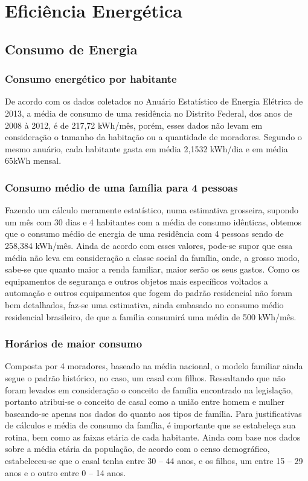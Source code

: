 \chapter{Eficiência Energética}
\section{Consumo de Energia}

\subsection{Consumo energético por habitante}

	De acordo com os dados coletados no Anuário Estatístico de Energia Elétrica de 2013, a média de consumo de uma residência no Distrito Federal, dos anos de 2008 à 2012, é de 217,72 kWh/mês, porém, esses dados não levam em consideração o tamanho da habitação ou a quantidade de moradores. Segundo o mesmo anuário, cada habitante gasta em média 2,1532 kWh/dia e em média 65kWh mensal\cite{2013Aneel}.

\subsection{Consumo médio de uma família para 4 pessoas}

	Fazendo um cálculo meramente estatístico, numa estimativa grosseira, supondo um mês com 30 dias e 4 habitantes com a média de consumo idênticas, obtemos que o consumo médio de energia de uma residência com 4 pessoas sendo de 258,384 kWh/mês. Ainda de acordo com esses valores, pode-se supor que essa média não leva em consideração a classe social da família, onde, a grosso modo, sabe-se que quanto maior a renda familiar, maior serão os seus gastos. Como os equipamentos de segurança e outros objetos mais específicos voltados a automação e outros equipamentos que fogem do padrão residencial não foram bem detalhados, faz-se uma estimativa, ainda embasado no consumo médio residencial brasileiro, de que a família consumirá uma média de 500 kWh/mês.

\subsection{Horários de maior consumo}

	Composta por 4 moradores, baseado na média nacional, o modelo familiar ainda segue o padrão histórico, no caso, um casal com filhos. Ressaltando que não foram levados em consideração o conceito de família encontrado na legislação, portanto atribui-se o conceito de casal como a união entre homem e mulher baseando-se apenas nos dados do \cite{IBGE} quanto aos tipos de família. Para justificativas de cálculos e média de consumo da família, é importante que se estabeleça sua rotina, bem como as faixas etária de cada habitante. Ainda com base nos dados sobre a média etária da população, de acordo com o censo demográfico, estabeleceu-se que o casal tenha entre 30 – 44 anos, e os filhos, um entre 15 – 29 anos e o outro entre 0 – 14 anos.


